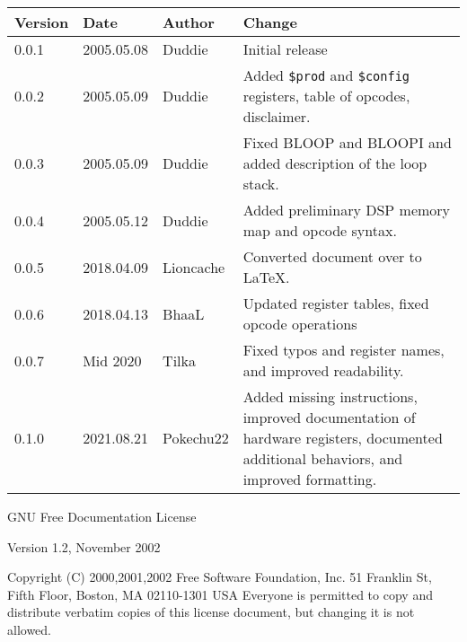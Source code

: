 \documentclass[oneside,english,a4paper,10pt,oneside,openany,final]{memoir}
\newcommand{\Register}[1]{\texttt{#1}}
\begin{document}
\begin{table}[htb]
\centering
\begin{tabular}{|p{.5in}|p{.75in}|p{.75in}|p{3.5in}|}
\hline
\textbf{Version} & \textbf{Date} & \textbf{Author} & \textbf{Change}                                                                          \\ \hline
0.0.1            & 2005.05.08    & Duddie          & Initial release                                                                          \\ \hline
0.0.2            & 2005.05.09    & Duddie          & Added \Register{\$prod} and \Register{\$config} registers, table of opcodes, disclaimer. \\ \hline
0.0.3            & 2005.05.09    & Duddie          & Fixed BLOOP and BLOOPI and added description of the loop stack.                          \\ \hline
0.0.4            & 2005.05.12    & Duddie          & Added preliminary DSP memory map and opcode syntax.                                      \\ \hline
0.0.5            & 2018.04.09    & Lioncache       & Converted document over to LaTeX.                                                        \\ \hline
0.0.6            & 2018.04.13    & BhaaL           & Updated register tables, fixed opcode operations                                         \\ \hline
0.0.7            & Mid 2020      & Tilka           & Fixed typos and register names, and improved readability.                                \\ \hline
0.1.0            & 2021.08.21    & Pokechu22       & Added missing instructions, improved documentation of hardware registers, documented additional behaviors, and improved formatting. \\ \hline
\end{tabular}
\end{table}

\pagebreak{}


GNU Free Documentation License

Version 1.2, November 2002

  Copyright (C) 2000,2001,2002  Free Software Foundation, Inc.
  51 Franklin St, Fifth Floor, Boston, MA  02110-1301  USA
  Everyone is permitted to copy and distribute verbatim copies
  of this license document, but changing it is not allowed.
\end{document}
